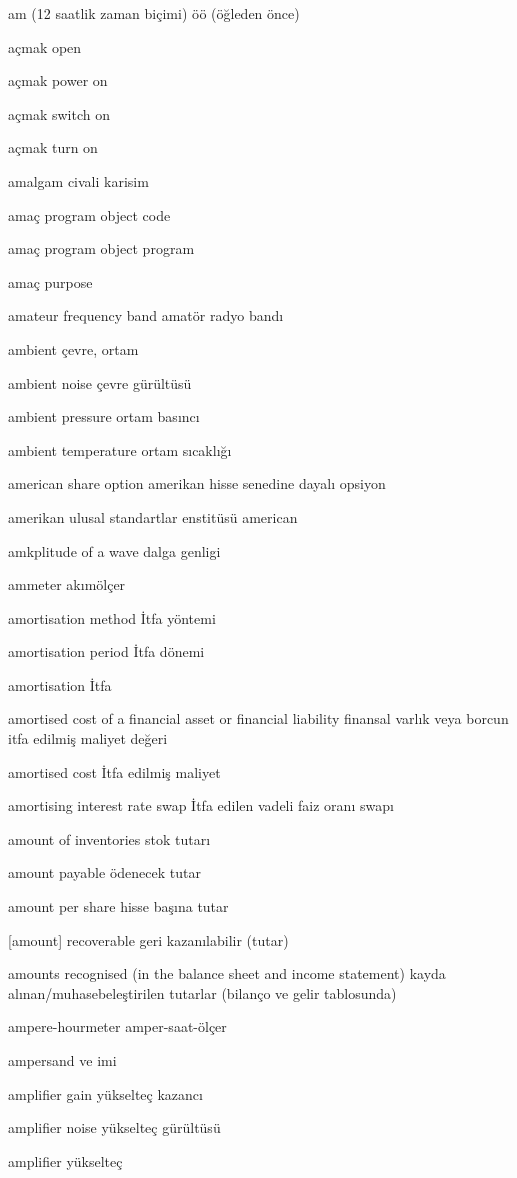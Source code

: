\documentclass[12pt,fleqn]{article}\usepackage{../../common}
\begin{document}
am (12 saatlik zaman biçimi) öö (öğleden önce)

açmak open

açmak power on

açmak switch on

açmak turn on

amalgam civali karisim

amaç program object code

amaç program object program

amaç purpose

amateur frequency band amatör radyo bandı

ambient çevre, ortam

ambient noise çevre gürültüsü

ambient pressure ortam basıncı

ambient temperature ortam sıcaklığı

american share option amerikan hisse senedine dayalı opsiyon

amerikan ulusal standartlar enstitüsü american

amkplitude of a wave dalga genligi

ammeter akımölçer

amortisation method İtfa yöntemi

amortisation period İtfa dönemi

amortisation İtfa

amortised cost of a financial asset or financial liability finansal varlık veya borcun itfa edilmiş maliyet değeri

amortised cost İtfa edilmiş maliyet

amortising interest rate swap İtfa edilen vadeli faiz oranı swapı

amount of inventories stok tutarı

amount payable ödenecek tutar

amount per share hisse başına tutar

[amount] recoverable geri kazanılabilir (tutar)

amounts recognised (in the balance sheet and income statement) kayda alınan/muhasebeleştirilen tutarlar (bilanço ve gelir tablosunda)

ampere-hourmeter amper-saat-ölçer

ampersand ve imi

amplifier gain yükselteç kazancı

amplifier noise yükselteç gürültüsü

amplifier yükselteç
\end{document}
